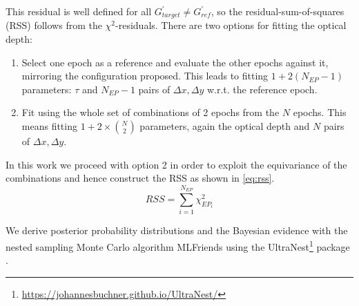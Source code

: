 \documentclass{aa}
\begin{document}
This residual is well defined for all $G_{target}^{\prime} \neq G_{ref}^{\prime}$, so the residual-sum-of-squares (RSS) follows from the $\chi^{2}$-residuals. 
There are two options for fitting the optical depth:
\begin{enumerate}
	\item Select one epoch as a reference and evaluate the other epochs against it, mirroring the configuration \cite{vanSluijs2018feasibility} proposed. This leads to fitting $1+2\left(N_{EP}-1\right)$ parameters: $\tau$ and $N_{EP}-1$ pairs of $\Delta x, \Delta y$ w.r.t. the reference epoch.
	\item Fit using the whole set of combinations of 2 epochs from the $N$ epochs. This means fitting $1+2\times\binom{N}{2}$ parameters, again the optical depth and $N$ pairs of $\Delta x, \Delta y$.
\end{enumerate}
In this work we proceed with option 2 in order to exploit the equivariance of the combinations and hence construct the RSS as shown in \autoref{eq:rss}.
\begin{equation}
\label{eq:rss}
	RSS = \sum_{i=1}^{N_{EP}} \chi^{2}_{EP_{i}}
\end{equation}


We derive posterior probability distributions and the Bayesian evidence with the nested sampling Monte Carlo algorithm MLFriends \citep{buchner2016nested, buchner2019nested} using the UltraNest\footnote{\url{https://johannesbuchner.github.io/UltraNest/}} package \citep{buchner2021UltraNest}. 
\end{document}
